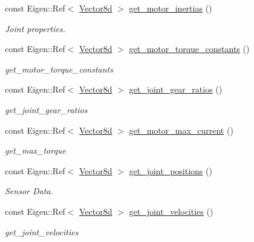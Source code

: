 \begin{DoxyCompactItemize}
const Eigen\+::\+Ref$<$ \hyperlink{common__header_8hpp_a98975ffbe0bca1296078e0350dfedd60}{Vector8d} $>$ \hyperlink{classblmc__robots_1_1Solo8TI_a21b4faac39d48f464cd29aea1c2eb9e2}{get\+\_\+motor\+\_\+inertias} ()
\begin{DoxyCompactList}\small\item\em Joint properties. \end{DoxyCompactList}\item 
const Eigen\+::\+Ref$<$ \hyperlink{common__header_8hpp_a98975ffbe0bca1296078e0350dfedd60}{Vector8d} $>$ \hyperlink{classblmc__robots_1_1Solo8TI_af421f0fa29744714c5e4a592501b972f}{get\+\_\+motor\+\_\+torque\+\_\+constants} ()
\begin{DoxyCompactList}\small\item\em get\+\_\+motor\+\_\+torque\+\_\+constants \end{DoxyCompactList}\item 
const Eigen\+::\+Ref$<$ \hyperlink{common__header_8hpp_a98975ffbe0bca1296078e0350dfedd60}{Vector8d} $>$ \hyperlink{classblmc__robots_1_1Solo8TI_a9f8c700d0646d5cc7f7e884b17aef1ab}{get\+\_\+joint\+\_\+gear\+\_\+ratios} ()
\begin{DoxyCompactList}\small\item\em get\+\_\+joint\+\_\+gear\+\_\+ratios \end{DoxyCompactList}\item 
const Eigen\+::\+Ref$<$ \hyperlink{common__header_8hpp_a98975ffbe0bca1296078e0350dfedd60}{Vector8d} $>$ \hyperlink{classblmc__robots_1_1Solo8TI_a6258a43a859e3cb589e7ed4ad7ca23cc}{get\+\_\+motor\+\_\+max\+\_\+current} ()
\begin{DoxyCompactList}\small\item\em get\+\_\+max\+\_\+torque \end{DoxyCompactList}\item 
const Eigen\+::\+Ref$<$ \hyperlink{common__header_8hpp_a98975ffbe0bca1296078e0350dfedd60}{Vector8d} $>$ \hyperlink{classblmc__robots_1_1Solo8TI_ac9165114408f88accbaa151b797ed1b6}{get\+\_\+joint\+\_\+positions} ()
\begin{DoxyCompactList}\small\item\em Sensor Data. \end{DoxyCompactList}\item 
const Eigen\+::\+Ref$<$ \hyperlink{common__header_8hpp_a98975ffbe0bca1296078e0350dfedd60}{Vector8d} $>$ \hyperlink{classblmc__robots_1_1Solo8TI_ae419d6776511856df3ff54e348774a97}{get\+\_\+joint\+\_\+velocities} ()
\begin{DoxyCompactList}\small\item\em get\+\_\+joint\+\_\+velocities \end{DoxyCompactList}\item 

\end{DoxyCompactItemize}
